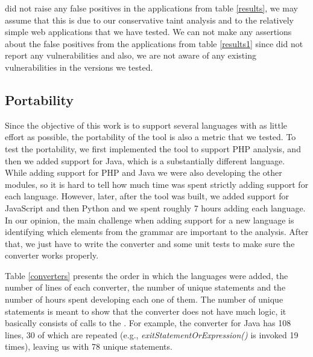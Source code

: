 \toolname{} did not raise any false positives in the applications from table \ref{results}, we may assume that this is due to our conservative taint analysis and to the relatively simple web applications that we have tested. We can not make any assertions about the false positives from the applications from table \ref{results1} since \toolname{} did not report any vulnerabilities and also, we are not aware of any existing vulnerabilities in the versions we tested.





\subsection{Portability}

Since the objective of this work is to support several languages with as little effort as possible, the portability of the tool is also a metric that we tested. To test the portability, we first implemented the tool to support PHP analysis, and then we added support for Java, which is a substantially different language. While adding support for PHP and Java we were also developing the other modules, so it is hard to tell how much time was spent strictly adding support for each language. However, later, after the tool was built, we added support for JavaScript and then Python and we spent roughly 7 hours adding each language. In our opinion, the main challenge when adding support for a new language is identifying which elements from the grammar are important to the analysis. After that, we just have to  write the converter and some unit tests to make sure the converter works properly.

Table \ref{converters} presents the order in which the languages were added, the number of lines of each converter, the number of unique statements and the number of hours spent developing each one of them.
The number of unique statements is meant to show that the converter does not have much logic, it basically consists of calls to the \astbuilder{}. For example, the converter for Java has 108 lines, 30 of which are repeated (e.g., \textit{exitStatementOrExpression()} is invoked 19 times), leaving us with 78 unique statements.

